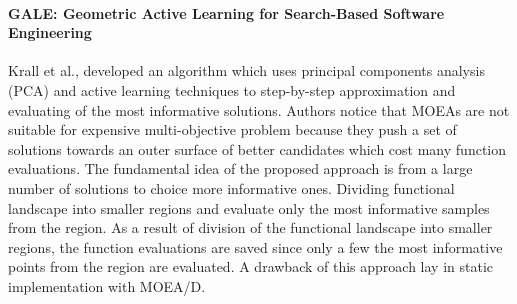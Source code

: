         \paragraph{GALE: Geometric Active Learning for Search-Based Software Engineering} Krall et al.,\cite{KrallMD15} developed an algorithm which uses principal components analysis (PCA) and active learning techniques to step-by-step approximation and evaluating of the most informative solutions. Authors notice that MOEAs are not suitable for expensive multi-objective problem because they push a set of solutions towards an outer surface of better candidates which cost many function evaluations. The fundamental idea of the proposed approach is from a large number of solutions to choice more informative ones. Dividing functional landscape into smaller regions and evaluate only the most informative samples from the region. As a result of division of the functional landscape into smaller regions, the function evaluations are saved since only a few the most informative points from the region are evaluated. A drawback of this approach lay in static implementation with MOEA/D.     


